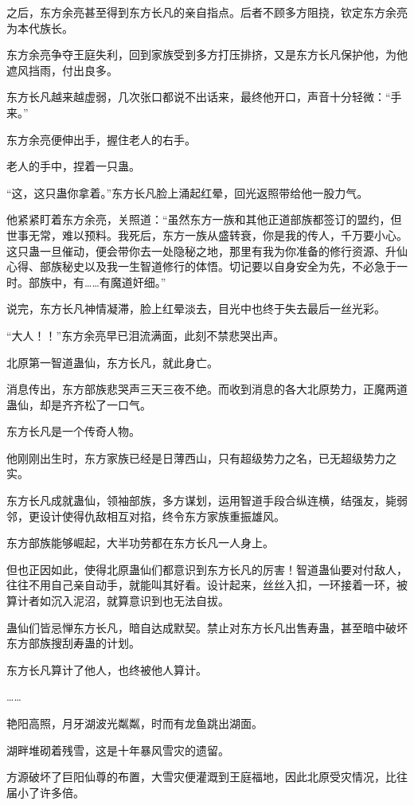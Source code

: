 \begin{this_body}
之后，东方余亮甚至得到东方长凡的亲自指点。后者不顾多方阻挠，钦定东方余亮为本代族长。

东方余亮争夺王庭失利，回到家族受到多方打压排挤，又是东方长凡保护他，为他遮风挡雨，付出良多。

东方长凡越来越虚弱，几次张口都说不出话来，最终他开口，声音十分轻微：“手来。”

东方余亮便伸出手，握住老人的右手。

老人的手中，捏着一只蛊。

“这，这只蛊你拿着。”东方长凡脸上涌起红晕，回光返照带给他一股力气。

他紧紧盯着东方余亮，关照道：“虽然东方一族和其他正道部族都签订的盟约，但世事无常，难以预料。我死后，东方一族从盛转衰，你是我的传人，千万要小心。这只蛊一旦催动，便会带你去一处隐秘之地，那里有我为你准备的修行资源、升仙心得、部族秘史以及我一生智道修行的体悟。切记要以自身安全为先，不必急于一时。部族中，有……有魔道奸细。”

说完，东方长凡神情凝滞，脸上红晕淡去，目光中也终于失去最后一丝光彩。

“大人！！”东方余亮早已泪流满面，此刻不禁悲哭出声。

北原第一智道蛊仙，东方长凡，就此身亡。

消息传出，东方部族悲哭声三天三夜不绝。而收到消息的各大北原势力，正魔两道蛊仙，却是齐齐松了一口气。

东方长凡是一个传奇人物。

他刚刚出生时，东方家族已经是日薄西山，只有超级势力之名，已无超级势力之实。

东方长凡成就蛊仙，领袖部族，多方谋划，运用智道手段合纵连横，结强友，毙弱邻，更设计使得仇敌相互对掐，终令东方家族重振雄风。

东方部族能够崛起，大半功劳都在东方长凡一人身上。

但也正因如此，使得北原蛊仙们都意识到东方长凡的厉害！智道蛊仙要对付敌人，往往不用自己亲自动手，就能叫其好看。设计起来，丝丝入扣，一环接着一环，被算计者如沉入泥沼，就算意识到也无法自拔。

蛊仙们皆忌惮东方长凡，暗自达成默契。禁止对东方长凡出售寿蛊，甚至暗中破坏东方部族搜刮寿蛊的计划。

东方长凡算计了他人，也终被他人算计。

……

艳阳高照，月牙湖波光粼粼，时而有龙鱼跳出湖面。

湖畔堆砌着残雪，这是十年暴风雪灾的遗留。

方源破坏了巨阳仙尊的布置，大雪灾便灌溉到王庭福地，因此北原受灾情况，比往届小了许多倍。


\end{this_body}

